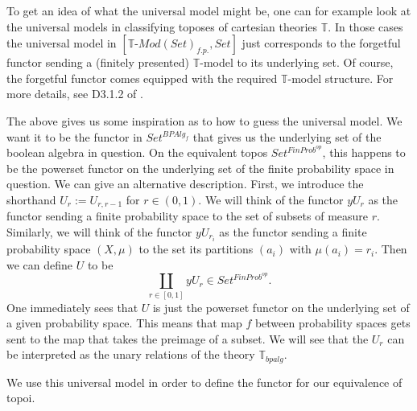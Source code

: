 \documentclass[a4paper]{amsproc}
\theoremstyle{plain}
\theoremstyle{definition}
\theoremstyle{remark}
\numberwithin{equation}{section}
\begin{document}
To get an idea of what the universal model might be, one can for example look at the universal models in classifying toposes of cartesian theories $\mathbb{T}$. In those cases the universal model in $[\mathbb{T} \text{-} Mod(Set)_{f.p.}, Set]$ just corresponds to the forgetful functor sending a (finitely presented) $\mathbb{T}$-model to its underlying set. Of course, the forgetful functor comes equipped with the required $\mathbb{T}$-model structure. For more details, see D3.1.2 of \cite{elephant}.

The above gives us some inspiration as to how to guess the universal model. We want it to be the functor in $Set^{BPAlg_f}$ that gives us the underlying set of the boolean algebra in question. On the equivalent topos $Set^{FinProb^{op}}$, this happens to be the powerset functor on the underlying set of the finite probability space in question. We can give an alternative description. First, we introduce the shorthand $U_r := U_{r,r-1}$ for $r \in (0,1)$. We will think of the functor $y U_r$ as the functor sending a finite probability space to the set of subsets of measure $r$. Similarly, we will think of the functor $y U_{r_i}$ as the functor sending a finite probability space $(X,\mu)$ to the set its partitions $(a_i)$ with $\mu(a_i) = r_i$. Then we can define $U$ to be
\[
\coprod_{r \in [0,1]} y U_r \in Set^{FinProb^{op}} .
\]
One immediately sees that $U$ is just the powerset functor on the underlying set of a given probability space. This means that map $f$ between probability spaces gets sent to the map that takes the preimage of a subset. We will see that the $U_r$ can be interpreted as the unary relations of the theory $\mathbb{T}_{bpalg}$.

We use this universal model in order to define the functor for our equivalence of topoi.
\end{document}
